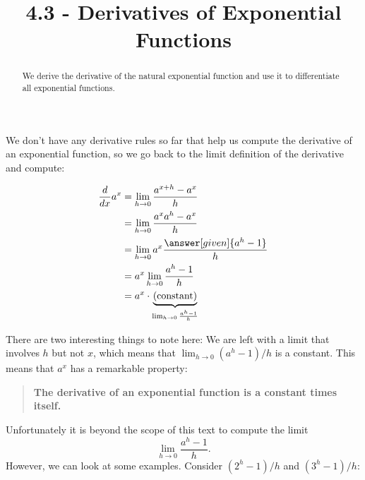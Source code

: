 \documentclass{ximera}
\title{4.3 - Derivatives of Exponential Functions}
\begin{document}
\begin{abstract}
  We derive the derivative of the natural exponential function and use it to differentiate all exponential functions.
\end{abstract}
\maketitle

We don't have any derivative rules so far that help us compute the derivative of an exponential function, so we go back to the limit definition of the derivative and compute:
\begin{explanation}
\begin{align*}
\ddx a^x &=\lim_{h\to 0} \frac{a^{x+h}-a^x}{h} \\
&=\lim_{h\to 0} \frac{a^xa^{h}-a^x}{h} \\
&=\lim_{h\to 0} a^x\frac{\answer[given]{a^{h}-1}}{h} \\
&=a^x\lim_{h\to 0} \frac{a^{h}-1}{h} \\
&=a^x \cdot \underbrace{\text{(constant)}}_{\lim_{h\to 0} \frac{a^{h}-1}{h}}
\end{align*}
\end{explanation}
There are two interesting things to note here: We are left with a
limit that involves $h$ but not $x$, which means that $
\lim_{h\to 0} (a^h-1)/h$ is a constant. This means that $a^x$ has a remarkable property:
\begin{quote}
  \textbf{The derivative of an exponential function is a constant
    times itself.}
\end{quote}
Unfortunately it is beyond the scope of this text to compute the limit
\[
\lim_{h\to 0} \frac{a^h-1}{h}.
\]
However, we can look at some examples. Consider $(2^h-1)/h$ and $(3^h-1)/h$:
\end{document}
